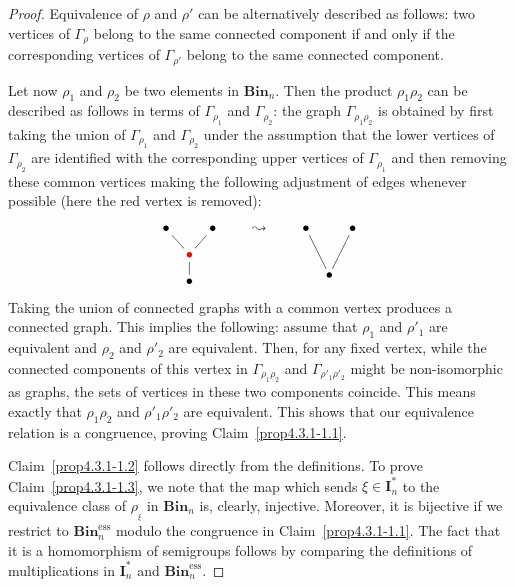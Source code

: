 \documentclass[a4paper]{amsart}
\begin{document}
\begin{proof}
Equivalence of $\rho$ and $\rho'$ can  be alternatively described
as follows: two vertices of $\Gamma_\rho$ belong to the same 
connected component if and only if the corresponding vertices 
of $\Gamma_{\rho'}$ belong to the same connected component. 

Let now $\rho_1$ and $\rho_2$ be two elements in $\mathbf{Bin}_n$. Then  the
product $\rho_1\rho_2$ can be described as follows in terms of 
$\Gamma_{\rho_1}$ and $\Gamma_{\rho_2}$: the graph $\Gamma_{\rho_1\rho_2}$ is
obtained by first taking the union of $\Gamma_{\rho_1}$ and $\Gamma_{\rho_2}$
under the assumption that the lower vertices of $\Gamma_{\rho_2}$ are 
identified with the corresponding upper vertices of  $\Gamma_{\rho_1}$ and then removing
these common vertices making the following adjustment of edges whenever possible
(here the {\color{red}red} vertex is removed):
\begin{displaymath}
\xymatrix@R=3mm@C=2mm{\bullet\ar@{-}[rd]&&\bullet\ar@{-}[ld]\\
&{\color{red}\bullet}\ar@{-}[d]&\\&\bullet&}\qquad\leadsto\qquad
\xymatrix@R=3mm@C=2mm{\bullet\ar@{-}[rdd]&&\bullet\ar@{-}[ldd]\\
&&\\&\bullet&}
\end{displaymath}
Taking the union of connected graphs with a common vertex produces a
connected graph. This implies the following: assume that 
$\rho_1$ and $\rho'_1$ are equivalent and $\rho_2$ and $\rho'_2$
are equivalent. Then, for any fixed vertex, while the connected components of
this vertex in $\Gamma_{\rho_1\rho_2}$ and $\Gamma_{\rho'_1\rho'_2}$ might 
be non-isomorphic as graphs, the sets of vertices in these two components
coincide. This means exactly that $\rho_1\rho_2$ and $\rho'_1\rho'_2$
are equivalent. This shows that our equivalence relation is a congruence,
proving Claim~\eqref{prop4.3.1-1.1}.

Claim~\eqref{prop4.3.1-1.2} follows directly from the definitions.
To prove Claim~\eqref{prop4.3.1-1.3}, we note that the
map which sends $\xi\in \mathbf{I}^*_n$ to the 
equivalence class of $\rho_{{}_\xi}$ in $\mathbf{Bin}_n$ is, clearly, injective.
Moreover, it is bijective if we restrict to $\mathbf{Bin}_n^\mathrm{ess}$
modulo the congruence in Claim~\eqref{prop4.3.1-1.1}.
The fact that it is a homomorphism of semigroups follows by comparing the 
definitions of multiplications in $\mathbf{I}^*_n$ and $\mathbf{Bin}_n^\mathrm{ess}$. 
\end{proof}
\end{document}
